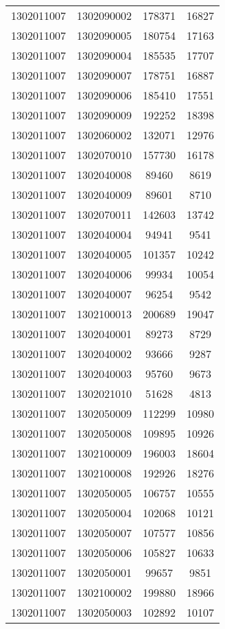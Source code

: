 \begin{longtable}[h]{llcc}
		1302011007 & 1302090002 & 178371 & 16827\\
		1302011007 & 1302090005 & 180754 & 17163\\
		1302011007 & 1302090004 & 185535 & 17707\\
		1302011007 & 1302090007 & 178751 & 16887\\
		1302011007 & 1302090006 & 185410 & 17551\\
		1302011007 & 1302090009 & 192252 & 18398\\
		1302011007 & 1302060002 & 132071 & 12976\\
		1302011007 & 1302070010 & 157730 & 16178\\
		1302011007 & 1302040008 & 89460 & 8619\\
		1302011007 & 1302040009 & 89601 & 8710\\
		1302011007 & 1302070011 & 142603 & 13742\\
		1302011007 & 1302040004 & 94941 & 9541\\
		1302011007 & 1302040005 & 101357 & 10242\\
		1302011007 & 1302040006 & 99934 & 10054\\
		1302011007 & 1302040007 & 96254 & 9542\\
		1302011007 & 1302100013 & 200689 & 19047\\
		1302011007 & 1302040001 & 89273 & 8729\\
		1302011007 & 1302040002 & 93666 & 9287\\
		1302011007 & 1302040003 & 95760 & 9673\\
		1302011007 & 1302021010 & 51628 & 4813\\
		1302011007 & 1302050009 & 112299 & 10980\\
		1302011007 & 1302050008 & 109895 & 10926\\
		1302011007 & 1302100009 & 196003 & 18604\\
		1302011007 & 1302100008 & 192926 & 18276\\
		1302011007 & 1302050005 & 106757 & 10555\\
		1302011007 & 1302050004 & 102068 & 10121\\
		1302011007 & 1302050007 & 107577 & 10856\\
		1302011007 & 1302050006 & 105827 & 10633\\
		1302011007 & 1302050001 & 99657 & 9851\\
		1302011007 & 1302100002 & 199880 & 18966\\
		1302011007 & 1302050003 & 102892 & 10107\\

\end{longtable}
